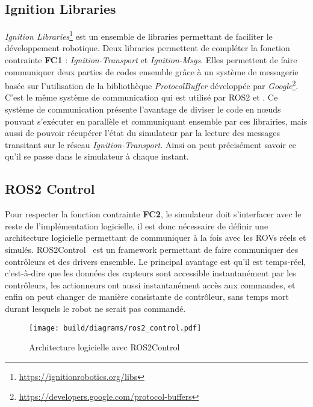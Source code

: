         \subsection{Ignition Libraries}

            \textit{Ignition Libraries}\footnote{\url{https://ignitionrobotics.org/libs}} est un ensemble de libraries permettant de faciliter le développement robotique. Deux libraries permettent de compléter la fonction contrainte \textbf{FC1} : \textit{Ignition-Transport} et \textit{Ignition-Msgs}. Elles permettent de faire communiquer deux parties de codes ensemble grâce à un système de messagerie basée sur l'utilisation de la bibliothèque \textit{ProtocolBuffer} développée par \textit{Google}\footnote{\url{https://developers.google.com/protocol-buffers}}. C'est le même système de communication qui est utilisé par \gls{ROS2} et \gazebo{}. Ce système de communication présente l'avantage de diviser le code en n\oe uds pouvant s'exécuter en parallèle et communiquant ensemble par ces librairies, mais aussi de pouvoir récupérer l'état du simulateur par la lecture des messages transitant sur le réseau \textit{Ignition-Transport}. Ainsi on peut précisément savoir ce qu'il se passe dans le simulateur à chaque instant.

        \subsection{ROS2 Control}

            Pour respecter la fonction contrainte \textbf{FC2}, le simulateur doit s'interfacer avec le reste de l'implémentation logicielle, il est donc nécessaire de définir une architecture logicielle permettant de communiquer à la fois avec les \gls{ROV}s réels et simulés. \gls{ROS2Control}~\cite{ros_control} est un framework permettant de faire communiquer des contrôleurs et des drivers ensemble. Le principal avantage est qu'il est temps-réel, c'est-à-dire que les données des capteurs sont accessible instantanément par les contrôleurs, les actionneurs ont aussi instantanément accès aux commandes, et enfin on peut changer de manière consistante de contrôleur, sans temps mort durant lesquels le robot ne serait pas commandé.

            \begin{figure}[!htb]
                \centering
                \texttt{[image: build/diagrams/ros2\_control.pdf]}
                \caption{Architecture logicielle avec \gls{ROS2Control}}
                \label{fig:ros2_control}
            \end{figure}

